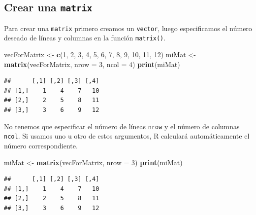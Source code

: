 \documentclass[
]{book}
\newenvironment{Shaded}{\begin{snugshade}}{\end{snugshade}}
\newcommand{\DataTypeTok}[1]{\textcolor[rgb]{0.13,0.29,0.53}{#1}}
\newcommand{\DecValTok}[1]{\textcolor[rgb]{0.00,0.00,0.81}{#1}}
\newcommand{\KeywordTok}[1]{\textcolor[rgb]{0.13,0.29,0.53}{\textbf{#1}}}
\newcommand{\NormalTok}[1]{#1}
\newcommand{\StringTok}[1]{\textcolor[rgb]{0.31,0.60,0.02}{#1}}
\begin{document}
\hypertarget{crear-una-matrix}{%
\subsection{\texorpdfstring{Crear una \texttt{matrix}}{Crear una matrix}}\label{crear-una-matrix}}

Para crear una \texttt{matrix} primero creamos un \texttt{vector}, luego especificamos el número deseado de líneas y columnas en la función \texttt{matrix()}.

\begin{Shaded}
\begin{Highlighting}[]
\NormalTok{vecForMatrix <-}\StringTok{ }\KeywordTok{c}\NormalTok{(}\DecValTok{1}\NormalTok{, }\DecValTok{2}\NormalTok{, }\DecValTok{3}\NormalTok{, }\DecValTok{4}\NormalTok{, }\DecValTok{5}\NormalTok{, }\DecValTok{6}\NormalTok{, }\DecValTok{7}\NormalTok{, }\DecValTok{8}\NormalTok{, }\DecValTok{9}\NormalTok{, }\DecValTok{10}\NormalTok{, }\DecValTok{11}\NormalTok{, }\DecValTok{12}\NormalTok{)}
\NormalTok{miMat <-}\StringTok{ }\KeywordTok{matrix}\NormalTok{(vecForMatrix, }\DataTypeTok{nrow =} \DecValTok{3}\NormalTok{, }\DataTypeTok{ncol =} \DecValTok{4}\NormalTok{)}
\KeywordTok{print}\NormalTok{(miMat)}
\end{Highlighting}
\end{Shaded}

\begin{verbatim}
##      [,1] [,2] [,3] [,4]
## [1,]    1    4    7   10
## [2,]    2    5    8   11
## [3,]    3    6    9   12
\end{verbatim}

No tenemos que especificar el número de líneas \texttt{nrow} y el número de columnas \texttt{ncol}. Si usamos uno u otro de estos argumentos, R calculará automáticamente el número correspondiente.

\begin{Shaded}
\begin{Highlighting}[]
\NormalTok{miMat <-}\StringTok{ }\KeywordTok{matrix}\NormalTok{(vecForMatrix, }\DataTypeTok{nrow =} \DecValTok{3}\NormalTok{)}
\KeywordTok{print}\NormalTok{(miMat)}
\end{Highlighting}
\end{Shaded}

\begin{verbatim}
##      [,1] [,2] [,3] [,4]
## [1,]    1    4    7   10
## [2,]    2    5    8   11
## [3,]    3    6    9   12
\end{verbatim}
\end{document}
